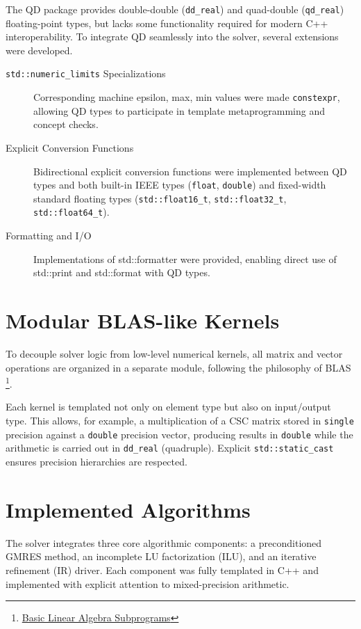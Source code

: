 The QD package provides double-double (\texttt{dd\_real}) and quad-double
(\texttt{qd\_real}) floating-point types, but lacks some functionality required
for modern C++ interoperability. To integrate QD seamlessly into the solver,
several extensions were developed.

\begin{description}
\item[\texttt{std::numeric\_limits} Specializations] Corresponding machine epsilon, max,
  min values were made \texttt{constexpr}, allowing QD types to participate in
  template metaprogramming and concept checks.
\item[Explicit Conversion Functions] Bidirectional explicit conversion functions
  were implemented between QD types and both built-in IEEE types
  (\texttt{float}, \texttt{double}) and fixed-width standard floating types
  (\texttt{std::float16\_t}, \texttt{std::float32\_t},
  \texttt{std::float64\_t}).
\item [Formatting and I/O] Implementations of std::formatter were provided,
  enabling direct use of std::print and std::format with QD types.
\end{description}

\section{Modular BLAS-like Kernels}
\label{sec:modular-blas-like}

To decouple solver logic from low-level numerical kernels, all matrix and vector
operations are organized in a separate module, following the philosophy of BLAS
\footnote{\href{https://www.netlib.org/blas/}{Basic Linear Algebra
    Subprograms}}.

Each kernel is templated not only on element type but also on input/output type.
This allows, for example, a multiplication of a CSC matrix stored in
\texttt{single} precision against a \texttt{double} precision vector, producing
results in \texttt{double} while the arithmetic is carried out in
\texttt{dd\_real} (quadruple). Explicit \texttt{std::static\_cast} ensures
precision hierarchies are respected.

\section{Implemented Algorithms}
\label{sec:impl-algo}

The solver integrates three core algorithmic components: a preconditioned GMRES
method, an incomplete LU factorization (ILU), and an iterative refinement (IR)
driver. Each component was fully templated in C++ and implemented with explicit
attention to mixed-precision arithmetic.

